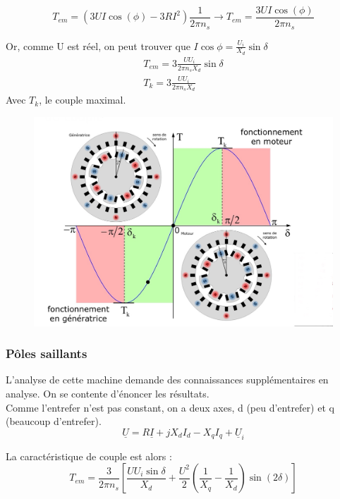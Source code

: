 \documentclass[../main.tex]{subfiles}
\begin{document}
\begin{equation}
    T_{em} = (3UI\cos(\phi)-3RI^2) \frac{1}{2\pi n_s} \rightarrow T_{em} = \frac{3UI\cos(\phi)}{2\pi n_s}
\end{equation}

Or, comme U est réel, on peut trouver que $I\cos\phi = \frac{U_i}{X_d}\sin \delta$\\

\begin{equation}
\begin{gathered}
    T_{em} = 3 \frac{U U_i}{2\pi n_s X_d}\sin \delta\\
    T_k = 3 \frac{UU_i}{2\pi n_s X_d}
    \end{gathered}
\end{equation}
Avec $T_k$, le couple maximal.\\

\begin{figure}[hbt!]
    \centering
    \includegraphics[width=.6\textwidth]{IMAGES/machineelec/IMG_0146.jpeg}
\end{figure}

\subsubsection{Pôles saillants}
L'analyse de cette machine demande des connaissances supplémentaires en analyse. On se contente d'énoncer les résultats.\\

Comme l'entrefer n'est pas constant, on a deux axes, d (peu d'entrefer) et q (beaucoup d'entrefer).\\
\begin{equation}
    \underline{U} = R\underline{I} + jX_dI_d - X_q I_q + \underline{U}_i
\end{equation}


La caractéristique de couple est alors : \\
\begin{equation}
    T_{em} = \frac{3}{2\pi n_s} [\frac{UU_i\sin \delta}{X_d} + \frac{U^2}{2} (\frac{1}{X_q}-\frac{1}{X_d})\sin(2\delta)]
\end{equation}
\end{document}

